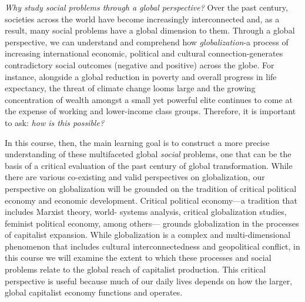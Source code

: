\documentclass[11pt,]{article}
\begin{document}
\emph{Why study social problems through a global perspective?} Over the
past century, societies across the world have become increasingly
interconnected and, as a result, many social problems have a global
dimension to them. Through a global perspective, we can understand and
comprehend how \emph{globalization}-a process of increasing
international economic, political and cultural connection-generates
contradictory social outcomes (negative and positive) across the globe.
For instance, alongside a global reduction in poverty and overall
progress in life expectancy, the threat of climate change looms large
and the growing concentration of wealth amongst a small yet powerful
elite continues to come at the expense of working and lower-income class
groups. Therefore, it is important to ask: \emph{how is this possible?}

In this course, then, the main learning goal is to construct a more
precise understanding of these multifaceted global \emph{social}
problems, one that can be the basis of a critical evaluation of the past
century of global transformation. While there are various co-existing
and valid perspectives on globalization, our perspective on
globalization will be grounded on the tradition of critical political
economy and economic development. Critical political economy---a
tradition that includes Marxist theory, world- systems analysis,
critical globalization studies, feminist political economy, among
others--- grounds globalization in the processes of capitalist
expansion. While globalization is a complex and multi-dimensional
phenomenon that includes cultural interconnectedness and geopolitical
conflict, in this course we will examine the extent to which these
processes and social problems relate to the global reach of capitalist
production. This critical perspective is useful because much of our
daily lives depends on how the larger, global capitalist economy
functions and operates.
\end{document}
